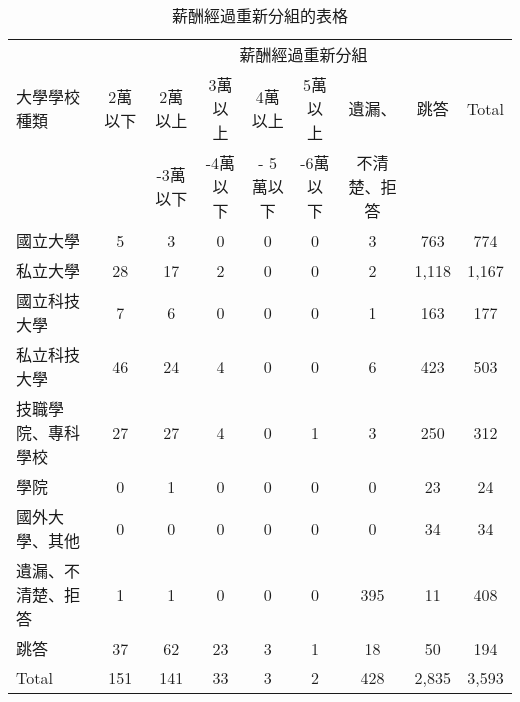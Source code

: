 \documentclass[12pt, a4paper]{article}
\begin{document}
\begin{table}[ht]
\centering
\renewcommand{\arraystretch}{1.3} %
\extrarowheight=4pt
\begin{adjustbox}{width=\textwidth}
\begin{tabular}{l*{8}{c}}
\toprule
& \multicolumn{8}{c}{薪酬經過重新分組} \\
\cmidrule(lr){2-9}
大學學校種類 & 2萬以下 & 2萬以上& 3萬以上 & 4萬以上 & 5萬以上 & 遺漏、 & 跳答 & Total \\
		   &    &-3萬以下    & -4萬以下  &- 5萬以下    & -6萬以下   & 不清楚、拒答   &   &  \\
\midrule
國立大學 & 5 & 3 & 0 & 0 & 0 & 3 & 763 & 774 \\
私立大學 & 28 & 17 & 2 & 0 & 0 & 2 & 1,118 & 1,167 \\
國立科技大學 & 7 & 6 & 0 & 0 & 0 & 1 & 163 & 177 \\
私立科技大學 & 46 & 24 & 4 & 0 & 0 & 6 & 423 & 503 \\
技職學院、專科學校 & 27 & 27 & 4 & 0 & 1 & 3 & 250 & 312 \\
學院 & 0 & 1 & 0 & 0 & 0 & 0 & 23 & 24 \\
國外大學、其他 & 0 & 0 & 0 & 0 & 0 & 0 & 34 & 34 \\
遺漏、不清楚、拒答 & 1 & 1 & 0 & 0 & 0 & 395 & 11 & 408 \\
跳答 & 37 & 62 & 23 & 3 & 1 & 18 & 50 & 194 \\
Total & 151 & 141 & 33 & 3 & 2 & 428 & 2,835 & 3,593 \\
\bottomrule
\end{tabular}
\end{adjustbox}
\caption{薪酬經過重新分組的表格}
\end{table}
\end{document}
